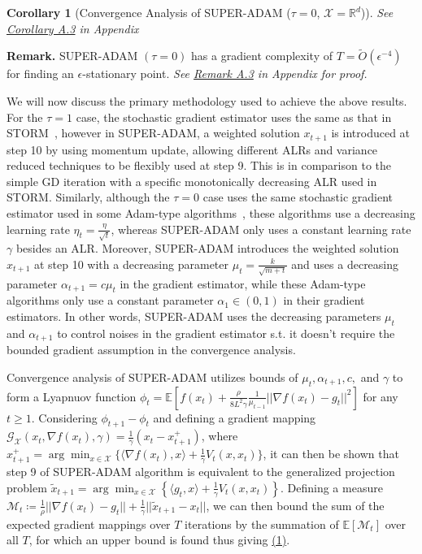 \documentclass{article}
\newtheorem{corollary}{Corollary}[section]
\begin{document}
\begin{corollary}[Convergence Analysis of SUPER-ADAM ($\tau = 0$, $\mathcal{X}=\mathbb{R}^d$)]
	See \hyperref[coro51appendix]{Corollary A.3} in Appendix
\end{corollary}
\textbf{Remark.} SUPER-ADAM $(\tau = 0)$ has a gradient complexity of $T = \tilde{O}(\epsilon^{-4})$ for finding an $\epsilon$-stationary point. \textit{See \hyperref[rmka3]{Remark A.3} in Appendix for proof.}

We will now discuss the primary methodology used to achieve the above results. For the $\tau = 1$ case, the stochastic gradient estimator uses the same as that in STORM~\cite{https://doi.org/10.48550/arxiv.1905.10018}, however in SUPER-ADAM, a weighted solution $x_{t+1}$ is introduced at step 10 by
using momentum update, allowing different ALRs and variance reduced techniques to be flexibly used at step 9. This is in comparison to the simple GD iteration with a specific monotonically decreasing ALR used in STORM. Similarly, although the $\tau = 0$ case uses the
same stochastic gradient estimator used in some Adam-type algorithms~\cite{https://doi.org/10.48550/arxiv.1412.6980, https://doi.org/10.48550/arxiv.1904.09237, https://doi.org/10.48550/arxiv.2010.07468}, these algorithms use a decreasing learning rate
$\eta_t = \frac{\eta}{\sqrt{t}}$, whereas SUPER-ADAM only uses a constant learning rate $\gamma$ besides an ALR. Moreover, SUPER-ADAM introduces the weighted solution $x_{t+1}$ at step 10 with a decreasing
parameter $\mu_t = \frac{k}{\sqrt{m+t}}$ and uses a decreasing parameter $\alpha_{t+1} = c\mu_t$ in the gradient estimator, while these Adam-type algorithms only use a constant parameter $\alpha_1\in (0,1)$ in their gradient estimators. In other words, SUPER-ADAM uses the
decreasing parameters $\mu_t$ and $\alpha_{t+1}$ to control noises in the gradient estimator s.t. it doesn't require the bounded gradient assumption in the convergence analysis.

Convergence analysis of SUPER-ADAM utilizes bounds of $\mu_t, \alpha_{t+1}, c,$ and $\gamma$ to form a Lyapnuov function $\phi_t = \mathbb{E}[f(x_t) + \frac{\rho}{8L^2 \gamma}\frac{1}{\mu_{t-1}}||\nabla f(x_t) - g_t||^2]$ for any $t\geq 1$. Considering
$\phi_{t+1} - \phi_t$ and defining a gradient mapping $\mathcal{G}_{\mathcal{X}}(x_t, \nabla f(x_t),\gamma) = \frac{1}{\gamma}(x_t - x^+_{t+1})$, where $x^+_{t+1} = \arg\min_{x\in\mathcal{X}}\{\langle\nabla f(x_t), x\rangle + \frac{1}{\gamma} V_t(x,x_t)\}$,
it can then be shown that step 9 of SUPER-ADAM algorithm is equivalent to the generalized projection problem $\tilde{x}_{t+1} = \arg\min_{x\in\mathcal{X}}\left\{\langle g_t, x\rangle + \frac{1}{\gamma}V_t (x,x_t)\right\}$.
Defining a measure $\mathcal{M}_t\coloneqq\frac{1}{\rho}||\nabla f(x_t) - g_t|| + \frac{1}{\gamma}||\tilde{x}_{t+1} - x_t||$,
we can then bound the sum of the expected gradient mappings over $T$ iterations by the summation of $\mathbb{E}[\mathcal{M}_t]$ over all $T$, for which an upper bound is found thus giving \hyperref[eq61]{(1)}.
\end{document}
